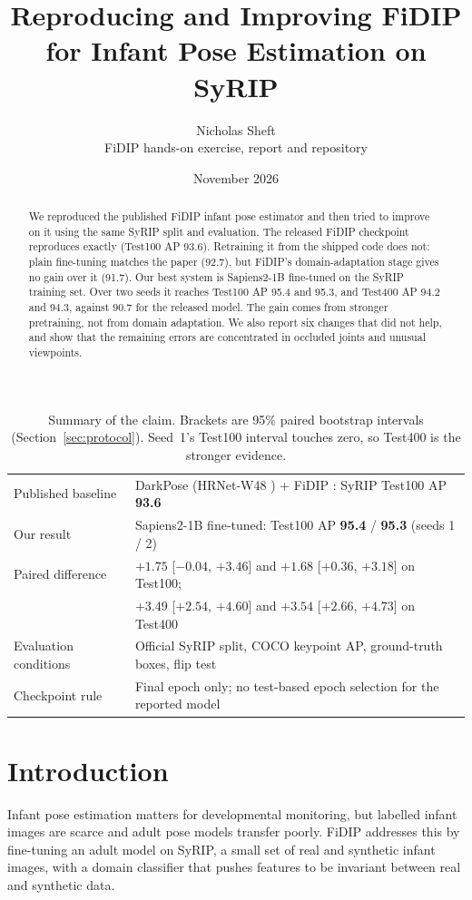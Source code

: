 \documentclass[11pt]{article}
\title{Reproducing and Improving FiDIP for Infant Pose Estimation on SyRIP}
\author{Nicholas Sheft \\ \small FiDIP hands-on exercise, report and repository}
\date{November 2026}
\begin{document}
\maketitle

\begin{abstract}
We reproduced the published FiDIP infant pose estimator and then tried to improve on it using the same SyRIP split and evaluation. The released FiDIP checkpoint reproduces exactly (Test100 AP 93.6). Retraining it from the shipped code does not: plain fine-tuning matches the paper (92.7), but FiDIP's domain-adaptation stage gives no gain over it (91.7). Our best system is Sapiens2-1B fine-tuned on the SyRIP training set. Over two seeds it reaches Test100 AP 95.4 and 95.3, and Test400 AP 94.2 and 94.3, against 90.7 for the released model. The gain comes from stronger pretraining, not from domain adaptation. We also report six changes that did not help, and show that the remaining errors are concentrated in occluded joints and unusual viewpoints.
\end{abstract}

\begin{table}[h]
\centering\small
\begin{tabular}{@{}ll@{}}
\toprule
Published baseline & DarkPose \cite{darkpose} (HRNet-W48 \cite{hrnet}) + FiDIP \cite{fidip}: SyRIP Test100 AP \textbf{93.6} \\
Our result & Sapiens2-1B fine-tuned: Test100 AP \textbf{95.4} / \textbf{95.3} (seeds 1 / 2) \\
Paired difference & $+1.75$ [$-0.04$, $+3.46$] and $+1.68$ [$+0.36$, $+3.18$] on Test100; \\
 & $+3.49$ [$+2.54$, $+4.60$] and $+3.54$ [$+2.66$, $+4.73$] on Test400 \\
Evaluation conditions & Official SyRIP split, COCO keypoint AP, ground-truth boxes, flip test \\
Checkpoint rule & Final epoch only; no test-based epoch selection for the reported model \\
\bottomrule
\end{tabular}
\caption{Summary of the claim. Brackets are 95\% paired bootstrap intervals (Section~\ref{sec:protocol}). Seed~1's Test100 interval touches zero, so Test400 is the stronger evidence.}
\label{tab:claim}
\end{table}

\section{Introduction}
Infant pose estimation matters for developmental monitoring, but labelled infant images are scarce and adult pose models transfer poorly. FiDIP \cite{fidip} addresses this by fine-tuning an adult model on SyRIP, a small set of real and synthetic infant images, with a domain classifier that pushes features to be invariant between real and synthetic data.
\end{document}
